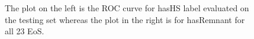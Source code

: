 \begin{figure}[htp]
  \centering
  \quad
  \caption{The plot on the left is the ROC curve for hasHS label evaluated on the testing set whereas the plot in the right is for hasRemnant for all 23 EoS. }
  \label{fig:ROC}
\end{figure}
